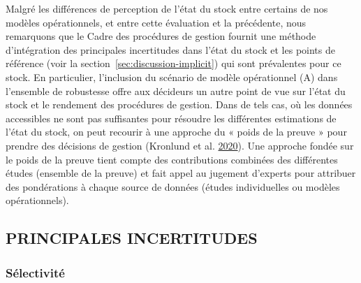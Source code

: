 \documentclass[11pt]{book}
\begin{document}
Malgré les différences de perception de l'état du stock entre certains de nos modèles opérationnels, et entre cette évaluation et la précédente, nous remarquons que le Cadre des procédures de gestion fournit une méthode d'intégration des principales incertitudes dans l'état du stock et les points de référence (voir la section~\ref{sec:discussion-implicit}) qui sont prévalentes pour ce stock. En particulier, l'inclusion du scénario de modèle opérationnel (A) dans l'ensemble de robustesse offre aux décideurs un autre point de vue sur l'état du stock et le rendement des procédures de gestion. Dans de tels cas, où les données accessibles ne sont pas suffisantes pour résoudre les différentes estimations de l'état du stock, on peut recourir à une approche du « poids de la preuve » pour prendre des décisions de gestion (Kronlund et al. \protect\hyperlink{ref-kronlund2020}{2020}). Une approche fondée sur le poids de la preuve tient compte des contributions combinées des différentes études (ensemble de la preuve) et fait appel au jugement d'experts pour attribuer des pondérations à chaque source de données (études individuelles ou modèles opérationnels).

\hypertarget{sec:discussion-uncertainties}{%
\subsection{PRINCIPALES INCERTITUDES}\label{sec:discussion-uncertainties}}

\hypertarget{sec:discussion-uncertainties-selectivity}{%
\subsubsection{Sélectivité}\label{sec:discussion-uncertainties-selectivity}}
\end{document}
